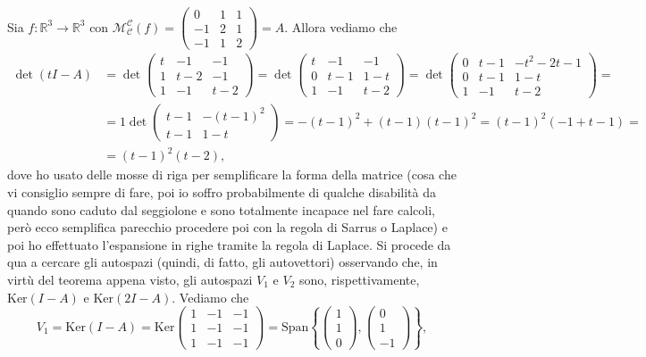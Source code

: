 \begin{example}
    Sia $f: \mathbb{R}^3 \to \mathbb{R}^3$ con $\mathcal{M}^\mathcal{C}_\mathcal{C}(f) = \begin{pmatrix}
        0 & 1 & 1 \\ -1 & 2 & 1 \\ -1 & 1 & 2
    \end{pmatrix} = A$. Allora vediamo che
    \begin{align}
        \det{(tI - A)} &= \det{\begin{pmatrix} t & -1 & -1 \\ 1 & t - 2 & -1 \\ 1 & -1 & t-2 \end{pmatrix}} = \det{\begin{pmatrix} t & -1 & -1 \\ 0 & t - 1 & 1-t \\ 1 & -1 & t-2 \end{pmatrix}} = \det{\begin{pmatrix} 0 & t-1 & -t^2 - 2t - 1 \\ 0 & t-1 & 1-t \\ 1 & -1 & t-2 \end{pmatrix}} = & \\
        &= 1 \det{\begin{pmatrix} t-1 & -(t-1)^2 \\ t-1 & 1-t \end{pmatrix}} = -(t-1)^2 + (t-1)(t-1)^2 = (t-1)^2(-1 + t - 1) = \\
        &= (t-1)^2(t-2),
    \end{align}
    dove ho usato delle mosse di riga per semplificare la forma della matrice (cosa che vi consiglio sempre di fare, poi io soffro probabilmente di qualche disabilità da quando sono caduto dal seggiolone e sono totalmente incapace nel fare calcoli, però ecco semplifica parecchio procedere poi con la regola di Sarrus o Laplace) e poi ho effettuato l'espansione in righe tramite la regola di Laplace.
    Si procede da qua a cercare gli autospazi (quindi, di fatto, gli autovettori) osservando che, in virtù del teorema appena visto, gli autospazi $V_1$ e $V_2$ sono, rispettivamente, $\text{Ker}(I - A)$ e $\text{Ker}(2I - A)$. Vediamo che
    $$
        V_1 = \text{Ker}(I - A) = \text{Ker} \begin{pmatrix}
            1 & -1 & -1 \\
            1 & -1 & -1 \\
            1 & -1 & -1
        \end{pmatrix} = \text{Span} \left\{ \begin{pmatrix} 1 \\ 1 \\ 0 \end{pmatrix}, \begin{pmatrix} 0 \\ 1 \\ -1 \end{pmatrix} \right\},
$$
\end{example}
